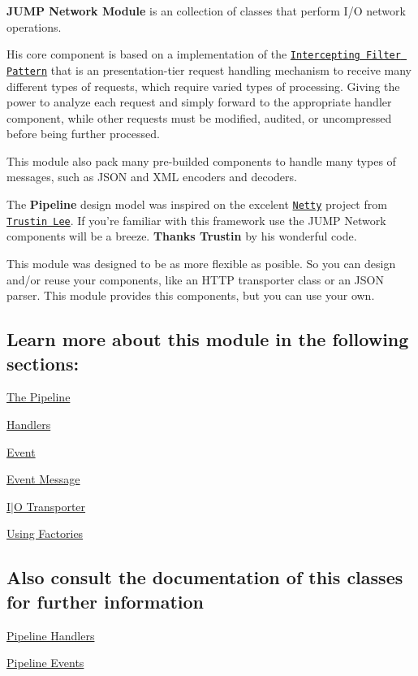 {\bfseries JUMP Network Module} is an collection of classes that perform I/O network operations.\par
 \par
 His core component is based on a implementation of the \href{http://java.sun.com/blueprints/corej2eepatterns/Patterns/InterceptingFilter.html}{\tt Intercepting Filter Pattern} that is an presentation-\/tier request handling mechanism to receive many different types of requests, which require varied types of processing. Giving the power to analyze each request and simply forward to the appropriate handler component, while other requests must be modified, audited, or uncompressed before being further processed.\par
 \par
 This module also pack many pre-\/builded components to handle many types of messages, such as JSON and XML encoders and decoders.\par
 \par
 The {\bfseries Pipeline} design model was inspired on the excelent \href{http://www.jboss.org/netty}{\tt Netty} project from \href{http://gleamynode.net/}{\tt Trustin Lee}. If you're familiar with this framework use the JUMP Network components will be a breeze. {\bfseries Thanks Trustin} by his wonderful code.\par
 \par
 This module was designed to be as more flexible as posible. So you can design and/or reuse your components, like an HTTP transporter class or an JSON parser. This module provides this components, but you can use your own.

\subsection*{Learn more about this module in the following sections:}


\begin{DoxyItemize}
\item \hyperlink{a00001}{The Pipeline}
\item \hyperlink{a00003}{Handlers}
\item \hyperlink{a00005}{Event}
\item \hyperlink{a00006}{Event Message}
\item \hyperlink{a00002}{I$|$O Transporter}
\item \hyperlink{a00004}{Using Factories}
\end{DoxyItemize}

\subsection*{Also consult the documentation of this classes for further information}


\begin{DoxyItemize}
\item \hyperlink{a00084}{Pipeline Handlers}
\item \hyperlink{a00085}{Pipeline Events} 
\end{DoxyItemize}